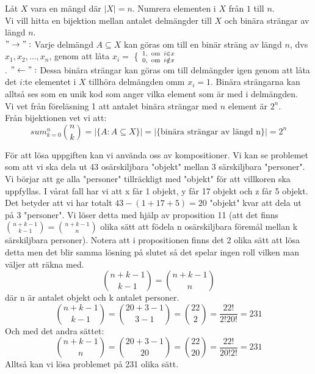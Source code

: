 \documentclass[nobib]{tufte-handout}
\begin{document}
\begin{xca}
Låt $X$ vara en mängd där $|X|=n$. Numrera elementen i $X$ från $1$ till $n$.\\

Vi vill hitta en bijektion mellan antalet delmängder till $X$ och binära strängar av längd $n$.\\
$"\rightarrow": $ Varje delmängd $ A\subseteq X $ kan göras om till en binär sträng av längd $n$, dvs $x_1,x_2,\ldots , x_n$, genom att låta $x_i=$ \Big \{ ${1,\, \textrm{ om } \, i\in x \atop 0, \, \textrm{ om }\, i \notin x}$ \\.
$"\leftarrow": $ Dessa binära strängar kan göras om till delmängder igen genom att låta det $i$:te elementet i $X$ tillhöra delmängden omm $x_i=1$. Binära strängarna kan alltså ses som en unik kod som anger vilka element som är med i delmängden.\\

Vi vet från föreläsning 1 att antalet binära strängar med $n$ element är $2^n$.\\
Från bijektionen vet vi att: $$sum_{k=0}^{n}\binom{n}{k}=|\{A:A\subseteq X\}|=|\{\text{binära strängar av längd n}\}|=2^n$$
\end{xca}


\begin{xca}
För att lösa uppgiften kan vi använda oss av kompositioner. Vi kan se problemet som att vi ska dela ut 43 osärskiljbara "objekt" mellan 3 särskiljbara "personer". Vi börjar att ge alla "personer" tillräckligt med "objekt" för att villkoren ska uppfyllas. I vårat fall har vi att x får 1 objekt, y får 17 objekt och z får 5 objekt. Det betyder att vi har totalt $43-(1+17+5)= 20$ "objekt" kvar att dela ut på 3 "personer". Vi löser detta med hjälp av proposition 11 (att det finns $\binom{n+k-1}{k-1}=\binom{n+k-1}{n}$ olika sätt att födela n osärskiljbara föremål mellan k särskiljbara personer). Notera att i propositionen finns det 2 olika sätt att lösa detta men det blir samma lösning på slutet så det spelar ingen roll vilken man väljer att räkna med.
$$\binom{n+k-1}{k-1}=\binom{n+k-1}{n}$$ där n är antalet objekt och k antalet personer.
$$\binom{n+k-1}{k-1}=\binom{20+3-1}{3-1}= \binom{22}{2}=\frac{22!}{2!20!}=231$$
Och med det andra sättet:
$$\binom{n+k-1}{n}=\binom{20+3-1}{20}= \binom{22}{20}=\frac{22!}{20!2!}=231$$
Alltså kan vi lösa problemet på 231 olika sätt.
\end{xca}
\end{document}
